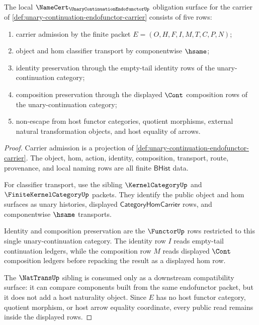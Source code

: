 \begin{theorem}
\label{thm:unary-continuation-endofunctor-namecert-obligations}
The local $\NameCert_{\UnaryContinuationEndofunctorUp}$ obligation surface for
the carrier of \autoref{def:unary-continuation-endofunctor-carrier} consists
of five rows:
\begin{enumerate}
\item carrier admission by the finite packet $E=(O,H,F,I,M,T,C,P,N)$;
\item object and hom classifier transport by componentwise $\hsame$;
\item identity preservation through the empty-tail identity rows of the
unary-continuation category;
\item composition preservation through the displayed $\Cont$ composition rows
of the unary-continuation category;
\item non-escape from host functor categories, quotient morphisms, external
natural transformation objects, and host equality of arrows.
\end{enumerate}
\end{theorem}
\begin{proof}
Carrier admission is a projection of
\autoref{def:unary-continuation-endofunctor-carrier}. The object, hom, action,
identity, composition, transport, route, provenance, and local naming rows are
all finite $\mathsf{BHist}$ data.

For classifier transport, use the sibling $\KernelCategoryUp$ and
$\FiniteKernelCategoryUp$ packets. They identify the public object and hom
surfaces as unary histories, displayed $\mathsf{CategoryHomCarrier}$ rows, and
componentwise $\hsame$ transports.

Identity and composition preservation are the $\FunctorUp$ rows restricted to
this single unary-continuation category. The identity row $I$ reads empty-tail
continuation ledgers, while the composition row $M$ reads displayed $\Cont$
composition ledgers before repacking the result as a displayed hom row.

The $\NatTransUp$ sibling is consumed only as a downstream compatibility
surface: it can compare components built from the same endofunctor packet, but
it does not add a host naturality object. Since $E$ has no host functor
category, quotient morphism, or host arrow equality coordinate, every public
read remains inside the displayed rows.
\end{proof}

